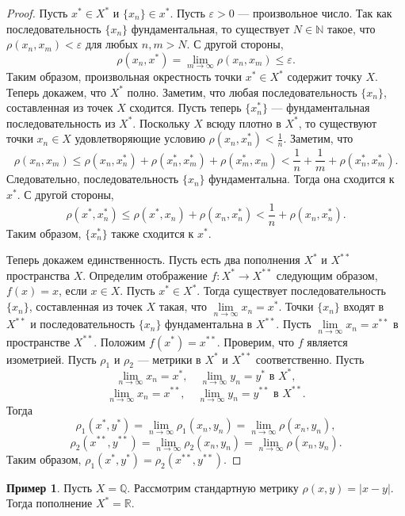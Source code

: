 \documentclass[12pt, titlepage, oneside]{amsbook}
\newcommand{\NN}{\mathbb{N}}
\newcommand{\RR}{\mathbb{R}}
\newcommand{\QQ}{\mathbb{Q}}
\theoremstyle{definition}
\newtheorem{example}[theorem]{Пример}
\theoremstyle{remark}
\begin{document}
\begin{proof}
Пусть $x^*\in X^*$ и $\{x_n\}\in x^*$. Пусть $\varepsilon>0$ --- произвольное число. Так как последовательность $\{x_n\}$ фундаментальная, то существует $N\in\NN$ такое, что $\rho(x_n,x_m)<\varepsilon$ для любых $n,m>N$. С другой стороны, $$\rho(x_n,x^*)=\lim\limits_{m\rightarrow\infty}\rho(x_n,x_m)\leq\varepsilon.$$ Таким образом, произвольная окрестность точки $x^*\in X^*$ содержит точку $X$. Теперь докажем, что $X^*$ полно. Заметим, что любая последовательность $\{x_n\}$, составленная из точек $X$ сходится. Пусть теперь $\{x^*_n\}$ --- фундаментальная последовательность из $X^*$. Поскольку $X$ всюду плотно в $X^*$, то существуют точки $x_n\in X$ удовлетворяющие условию $\rho(x_n,x^*_n)<\frac{1}{n}$. Заметим, что $$\rho(x_n,x_m)\leq\rho(x_n,x^*_n)+\rho(x^*_n,x^*_m)+\rho(x^*_m,x_m)<\frac{1}{n}+\frac{1}{m}+\rho(x^*_n,x^*_m).$$ Следовательно, последовательность $\{x_n\}$ фундаментальна. Тогда она сходится к $x^*$. С другой стороны, $$\rho(x^*,x^*_n)\leq\rho(x^*,x_n)+\rho(x_n,x^*_n)<\frac{1}{n}+\rho(x_n,x^*_n).$$ Таким образом, $\{x^*_n\}$ также сходится к $x^*$.
	
	Теперь докажем единственность. Пусть есть два пополнения $X^*$ и $X^{**}$ пространства $X$. Определим отображение $f\colon X^*\rightarrow X^{**}$ следующим образом, $f(x)=x$, если $x\in X$. Пусть $x^*\in X^*$. Тогда существует последовательность $\{x_n\}$, составленная из точек $X$ такая, что $\lim\limits_{n\rightarrow\infty} x_n=x^*$. Точки $\{x_n\}$ входят в $X^{**}$ и последовательность $\{x_n\}$ фундаментальна в $X^{**}$. Пусть $\lim\limits_{n\rightarrow\infty} x_n=x^{**}$ в пространстве $X^{**}$. Положим $f(x^*)=x^{**}.$ Проверим, что $f$ является изометрией. Пусть $\rho_1$ и $\rho_2$ --- метрики в $X^*$ и $X^{**}$ соответственно. Пусть $$\lim\limits_{n\rightarrow\infty} x_n=x^*,\quad \lim\limits_{n\rightarrow\infty} y_n=y^*\text{ в } X^*,$$ $$\lim\limits_{n\rightarrow\infty} x_n=x^{**},\quad \lim\limits_{n\rightarrow\infty} y_n=y^{**}\text{ в } X^{**}.$$ Тогда $$\rho_1(x^*,y^*)=\lim\limits_{n\rightarrow\infty}\rho_1(x_n,y_n)=\lim\limits_{n\rightarrow\infty}\rho(x_n,y_n),$$ $$\rho_2(x^{**},y^{**})=\lim\limits_{n\rightarrow\infty}\rho_2(x_n,y_n)=\lim\limits_{n\rightarrow\infty}\rho(x_n,y_n).$$ Таким образом, $\rho_1(x^*,y^*)=\rho_2(x^{**},y^{**})$.
\end{proof}

\begin{example}
	Пусть $X=\QQ$. Рассмотрим стандартную метрику $\rho(x,y)=|x-y|$. Тогда пополнение $X^*=\RR$.
\end{example}
\end{document}
